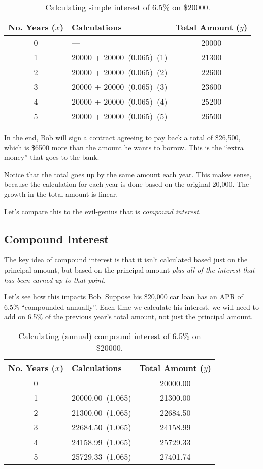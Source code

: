\begin{table}[!htbp]
\centering
\begin{tabular}{clc}
No. Years ($x$) & Calculations & Total Amount ($y$)\\\hline
0 & --- & 20000\\
1 & 20000 + 20000~(0.065)~(1) & 21300\\
2 & 20000 + 20000~(0.065)~(2) & 22600\\
3 & 20000 + 20000~(0.065)~(3) & 23600\\
4 & 20000 + 20000~(0.065)~(4) & 25200\\
5 & 20000 + 20000~(0.065)~(5) & 26500\\
\end{tabular}
\caption{Calculating simple interest of 6.5\% on \$20000.}
\label{table:bobsimple}
\end{table}

In the end, Bob will sign a contract agreeing to pay back a total of \$26,500, which is \$6500 more than the amount he wants to borrow. This is the ``extra money'' that goes to the bank.

Notice that the total goes up by the same amount each year. This makes sense, because the calculation for each year is done based on the original 20,000. The growth in the total amount is linear.

Let's compare this to the evil-genius that is \textit{compound interest}.


\subsection{Compound Interest}

The key idea of compound interest is that it isn't calculated based just on the principal amount, but based on the principal amount \textit{plus all of the interest that has been earned up to that point}.

Let's see how this impacts Bob. Suppose his \$20,000 car loan has an APR of 6.5\% ``compounded annually''. Each time we calculate his interest, we will need to add on 6.5\% of the previous year's total amount, not just the principal amount.

\begin{table}[!htbp]
\centering
\begin{tabular}{clc}
No. Years ($x$) & Calculations & Total Amount ($y$)\\\hline
0 & --- & 20000.00\\
1 & 20000.00~(1.065) & 21300.00\\
2 & 21300.00~(1.065) & 22684.50\\
3 & 22684.50~(1.065) & 24158.99\\
4 & 24158.99~(1.065) & 25729.33\\
5 & 25729.33~(1.065) & 27401.74\\
\end{tabular}
\caption{Calculating (annual) compound interest of 6.5\% on \$20000.}
\label{table:bobcompound}
\end{table}

